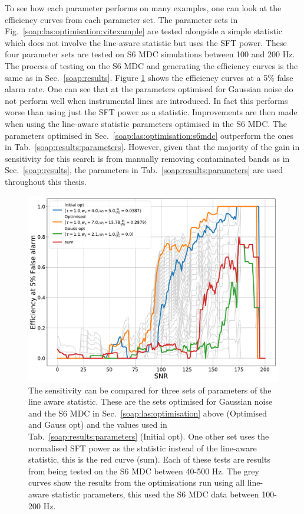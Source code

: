 To see how each parameter performs on many examples, one can look at the efficiency curves from each parameter set. 
The parameter sets in Fig.~\ref{soap:las:optimisation:vitexample} are tested alongside a simple statistic which does not involve the line-aware statistic but uses the \gls{SFT} power. 
These four parameter sets are tested on S6 \gls{MDC} simulations between 100 and 200 Hz.
The process of testing on the S6 \gls{MDC} and generating the efficiency curves is the same as in Sec.~\ref{soap:results}.
Figure \ref{soap:las:optimisation:comparison} shows the efficiency curves at a 5\% false alarm rate. 
One can see that at the parameters optimised for Gaussian noise do not perform well when instrumental lines are introduced. 
In fact this performs worse than using just the \gls{SFT} power as a statistic.
Improvements are then made when using the line-aware statistic parameters optimised in the S6 \gls{MDC}.
The parameters optimised in Sec.~\ref{soap:las:optimisation:s6mdc} outperform the ones in Tab.~\ref{soap:results:parameters}.
However, given that the majority of the gain in sensitivity for this search is from manually removing contaminated bands as in Sec.~\ref{soap:results}, the parameters in Tab.~\ref{soap:results:parameters} are used throughout this thesis.

\begin{figure}[h]
	\centering
	\includegraphics[width=0.9\linewidth]{C3_soap/optimised_comparison.pdf}
	\caption[Comparison of three sets of parameters of the line aware statistic.]{The sensitivity can be compared for three sets of parameters of the line aware statistic. These are the sets optimised for Gaussian noise and the S6 \gls{MDC} in Sec.~\ref{soap:las:optimisation} above (Optimised and Gauss opt) and the values used in Tab.~\ref{soap:results:parameters} (Initial opt). One other set uses the normalised \gls{SFT} power as the statistic instead of the line-aware statistic, this is the red curve (sum). Each of these tests are results from being tested on the S6 \gls{MDC} between 40-500 Hz. The grey curves show the results from the optimisations run using all line-aware statistic parameters, this used the S6 \gls{MDC} data between 100-200 Hz. }
	\label{soap:las:optimisation:comparison}
\end{figure}



